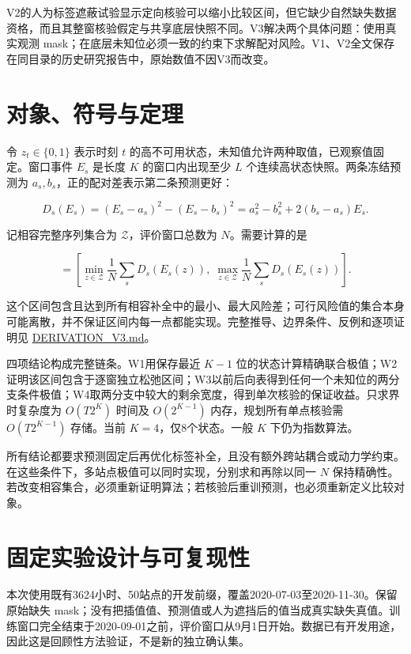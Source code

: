 \documentclass[UTF8,11pt,a4paper,fontset=windows]{ctexart}
\begin{document}
V2的人为标签遮蔽试验显示定向核验可以缩小比较区间，但它缺少自然缺失数据资格，而且其整窗核验假定与共享底层快照不同。V3解决两个具体问题：使用真实观测 mask；在底层未知位必须一致的约束下求解配对风险。V1、V2全文保存在同目录的历史研究报告中，原始数值不因V3而改变。


\section{对象、符号与定理}

令 $z_t\in\{0,1\}$ 表示时刻 $t$ 的高不可用状态，未知值允许两种取值，已观察值固定。窗口事件 $E_s$ 是长度 $K$ 的窗口内出现至少 $L$ 个连续高状态快照。两条冻结预测为 $a_s,b_s$，正的配对差表示第二条预测更好：


\begin{equation}
D_s(E_s)=(E_s-a_s)^2-(E_s-b_s)^2=a_s^2-b_s^2+2(b_s-a_s)E_s.\tag{R1}
\end{equation}

记相容完整序列集合为 $\mathcal Z$，评价窗口总数为 $N$。需要计算的是


\begin{equation}
[\underline\Delta,\overline\Delta]=\left[\min_{z\in\mathcal Z}\frac1N\sum_sD_s(E_s(z)),\;\max_{z\in\mathcal Z}\frac1N\sum_sD_s(E_s(z))\right].\tag{R2}
\end{equation}

这个区间包含且达到所有相容补全中的最小、最大风险差；可行风险值的集合本身可能离散，并不保证区间内每一点都能实现。完整推导、边界条件、反例和逐项证明见 \href{https://github.com/FreeSakura/UrbanEV/blob/main/docs/research/DERIVATION_V3.md}{DERIVATION\_V3.md}。


四项结论构成完整链条。W1用保存最近 $K-1$ 位的状态计算精确联合极值；W2证明该区间包含于逐窗独立松弛区间；W3以前后向表得到任何一个未知位的两分支条件极值；W4取两分支中较大的剩余宽度，得到单次核验的保证收益。只求界时复杂度为 $O(T2^K)$ 时间及 $O(2^{K-1})$ 内存，规划所有单点核验需 $O(T2^{K-1})$ 存储。当前 $K=4$，仅8个状态。一般 $K$ 下仍为指数算法。


所有结论都要求预测固定后再优化标签补全，且没有额外跨站耦合或动力学约束。在这些条件下，多站点极值可以同时实现，分别求和再除以同一 $N$ 保持精确性。若改变相容集合，必须重新证明算法；若核验后重训预测，也必须重新定义比较对象。


\section{固定实验设计与可复现性}

本次使用既有3624小时、50站点的开发前缀，覆盖2020-07-03至2020-11-30。保留原始缺失 mask；没有把插值值、预测值或人为遮挡后的值当成真实缺失真值。训练窗口完全结束于2020-09-01之前，评价窗口从9月1日开始。数据已有开发用途，因此这是回顾性方法验证，不是新的独立确认集。
\end{document}
